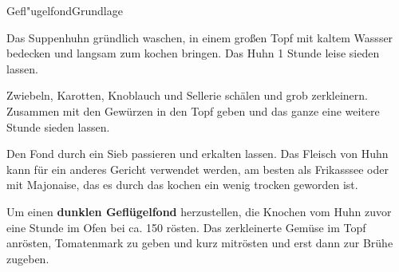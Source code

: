 \begin{recipe}{Gefl"ugelfond}{Grundlage}
  \label{Gefluegelfond}
  \inglist

  \steps

  Das Suppenhuhn gründlich waschen, in einem großen Topf mit kaltem Wassser
  bedecken und langsam zum kochen bringen. Das Huhn 1 Stunde leise sieden
  lassen.

  Zwiebeln, Karotten, Knoblauch und Sellerie schälen und grob zerkleinern.
  Zusammen mit den Gewürzen in den Topf geben und das ganze eine weitere
  Stunde sieden lassen.

  Den Fond durch ein Sieb passieren und erkalten lassen. Das Fleisch von Huhn
  kann für ein anderes Gericht verwendet werden, am besten als Frikasssee
  oder mit Majonaise, das es durch das kochen ein wenig trocken geworden ist.

  Um einen \textbf{dunklen Geflügelfond} herzustellen, die Knochen vom Huhn
  zuvor eine Stunde im Ofen bei ca. 150 \celsius rösten. Das zerkleinerte
  Gemüse im Topf anrösten, Tomatenmark zu geben und kurz mitrösten und erst
  dann zur Brühe zugeben.

\end{recipe}
